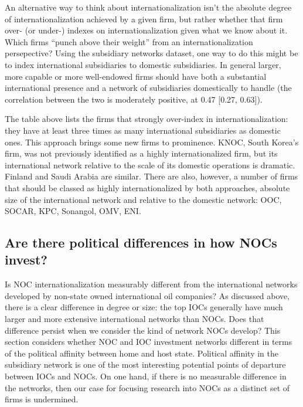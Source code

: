 \documentclass[11pt,]{book}
\begin{document}
An alternative way to think about internationalization isn't the absolute degree of internationalization achieved by a given firm, but rather whether that firm over- (or under-) indexes on internationalization given what we know about it. Which firms ``punch above their weight'' from an internationalization persepective? Using the subsidiary networks dataset, one way to do this might be to index international subsidiaries to domestic subsidiaries. In general larger, more capable or more well-endowed firms should have both a substantial international presence and a network of subsidiaries domestically to handle (the correlation between the two is moderately positive, at 0.47 {[}0.27, 0.63{]}).

The table above lists the firms that strongly over-index in internationalization: they have at least three times as many international subsidiaries as domestic ones. This approach brings some new firms to prominence. KNOC, South Korea's firm, was not previously identified as a highly internationalized firm, but its international network relative to the scale of its domestic operations is dramatic. Finland and Saudi Arabia are similar. There are also, however, a number of firms that should be classed as highly internationalized by both approaches, absolute size of the international network and relative to the domestic network: OOC, SOCAR, KPC, Sonangol, OMV, ENI.

\hypertarget{iocnoc01}{%
\subsection{Are there political differences in how NOCs invest?}\label{iocnoc01}}

Is NOC internationalization measurably different from the international networks developed by non-state owned international oil companies? As discussed above, there is a clear difference in degree or size: the top IOCs generally have much larger and more extensive international networks than NOCs. Does that difference persist when we consider the kind of network NOCs develop? This section considers whether NOC and IOC investment networks different in terms of the political affinity between home and host state. Political affinity in the subsidiary network is one of the most interesting potential points of departure between IOCs and NOCs. On one hand, if there is no measurable difference in the networks, then our case for focusing research into NOCs as a distinct set of firms is undermined.
\end{document}
